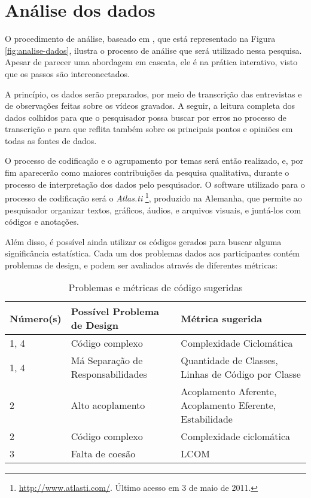 \section{Análise dos dados}
\label{sec:planejamento-analise}

O procedimento de análise, baseado em \cite{creswell}, que está representado na
Figura \ref{fig:analise-dados}, ilustra o processo de análise que será utilizado
nessa pesquisa. Apesar de parecer uma abordagem em cascata, ele é na prática 
interativo, visto que os passos são interconectados. 

A princípio, os dados serão preparados, por meio de transcrição das
entrevistas e de observações feitas sobre os vídeos gravados. 
A seguir, a leitura completa dos
dados colhidos para que o pesquisador possa buscar por erros no processo de
transcrição e para que reflita também sobre os principais pontos e opiniões em
todas as fontes de dados.

O processo de codificação e o agrupamento
por temas será então realizado, e, por fim aparecerão como maiores
contribuições da pesquisa qualitativa, durante o processo de interpretação dos
dados pelo pesquisador. O software utilizado para o processo de codificação será
o \textit{Atlas.ti} \footnote{\url{http://www.atlasti.com/}. Último acesso em 3
de maio de 2011.}, produzido na Alemanha, que permite ao pesquisador organizar textos,
gráficos, áudios, e arquivos visuais, e juntá-los com códigos e anotações. 

Além disso, é possível ainda utilizar os códigos gerados para buscar alguma significância
estatística. Cada um dos problemas dados aos participantes contém problemas de design, e
podem ser avaliados através de diferentes métricas:

\begin{table}[h!]
	\begin{tabular}{ | p{2cm} | p{7cm} | p{6cm} | }
		Número(s) & Possível Problema de Design & Métrica sugerida \\ \hline
		1, 4 & Código complexo & Complexidade Ciclomática \\
		1, 4 & Má Separação de Responsabilidades & Quantidade de Classes, Linhas de Código por Classe \\
		
		\hline
		
		2 & Alto acoplamento & Acoplamento Aferente, Acoplamento Eferente, Estabilidade \\
		2 & Código complexo & Complexidade ciclomática \\
		
		\hline
		
		3 & Falta de coesão & LCOM \\
		
		\hline
		
	\end{tabular}
	\caption{Problemas e métricas de código sugeridas}
\end{table}

